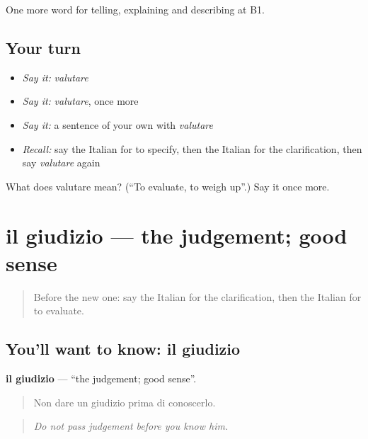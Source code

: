 \begin{grammarlens}[title={What you've built}]
One more word for telling, explaining and describing at B1.
\end{grammarlens}

\subsection*{Your turn}
\begin{itemize}
\raggedright
  \item \emph{Say it:} \emph{valutare}
  \item \emph{Say it:} \emph{valutare}, once more
  \item \emph{Say it:} a sentence of your own with \emph{valutare}
  \item \emph{Recall:} say the Italian for to specify, then the Italian for the clarification, then say \emph{valutare} again
\end{itemize}

\begin{tcolorbox}[breakable,colback=teal!4,colframe=teal!35!black,title={Before you move on}]
What does valutare mean? (\textquotedblleft{}To evaluate, to weigh up\textquotedblright{}.) Say it once more.
\end{tcolorbox}
\section[il giudizio]{il giudizio — the judgement; good sense}

\label{lesson:IT-C347-giudizio}



\begin{quote}
Before the new one: say the Italian for the clarification, then the Italian for to evaluate.
\end{quote}

\subsection*{You'll want to know: il giudizio}
\textbf{il giudizio} — \textquotedblleft{}the judgement; good sense\textquotedblright{}.

\begin{quote}
Non dare un giudizio prima di conoscerlo.
\end{quote}

\begin{quote}
\emph{Do not pass judgement before you know him.}
\end{quote}

